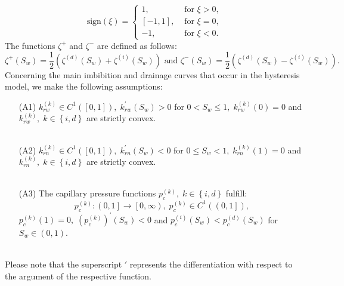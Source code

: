 \documentclass[smallextended]{svjour3}       %
\begin{document}
$$
\text{sign} \left( \xi \right) = 
\begin{cases}
 1, &\text{ for } \xi > 0,\\
 \left[-1,1 \right], &\text{ for } \xi = 0,\\
 -1, & \text{ for } \xi < 0.
\end{cases}
$$
The functions $\zeta^+$ and $\zeta^-$ are defined as follows:
$$
\zeta^+\left( S_w \right) = \frac 12 \left( \zeta^{(d)}\left( S_w \right) + \zeta^{(i)}\left( S_w \right) \right) \text{ and } 
\zeta^-\left( S_w \right) = \frac 12 \left( \zeta^{(d)}\left( S_w \right) - \zeta^{(i)}\left( S_w \right) \right).
$$
Concerning the main imbibition and drainage curves that occur in the hysteresis model, we make the following assumptions:
\ \\
\begin{itemize}
 \item[(A1)] $k_{rw}^{\left(k \right)} \in C^1\left( \left[0,1 \right] \right),\;k_{rw}^\prime\left( S_w \right)>0$ for $0<S_w \leq 1,\;k_{rw}^{\left(k \right)}\left( 0 \right) = 0$
 and $k_{rw}^{\left( k \right)},\;k \in \left\{ i,d \right\}$ are strictly convex.\\
 \\
 \item[(A2)] $k_{rn}^{\left(k \right)} \in C^1\left( \left[0,1 \right] \right),\;k_{rn}^\prime\left( S_w \right)<0$ for $0 \leq S_w < 1,\;k_{rn}^{\left(k \right)}\left( 1 \right) = 0$
 and $k_{rn}^{\left( k \right)},\;k \in \left\{ i,d \right\}$ are strictly convex.\\
 \\
 \item[(A3)] The capillary pressure functions $p_c^{\left(k \right)},\;k \in \left\{ i,d \right\}$ fulfill: 
 $$
 p_c^{\left(k \right)}: \left(0,1 \right] \rightarrow \left[0,\infty \right),\;p_c^{\left(k \right)} \in C^1\left( \left( 0,1 \right] \right),
 $$
 $p_c^{\left(k \right)} \left( 1 \right) = 0,\; \left( p_c^{\left(k \right)} \right)^\prime\left(S_w \right) < 0$ and $p_c^{\left( i \right)}\left(S_w \right) < p_c^{\left( d \right)}\left(S_w \right)$ for
 $S_w \in \left(0,1 \right)$.
\end{itemize}
\ \\
Please note that the superscript $\prime$ represents the differentiation with respect to the argument of the respective function.
\end{document}
